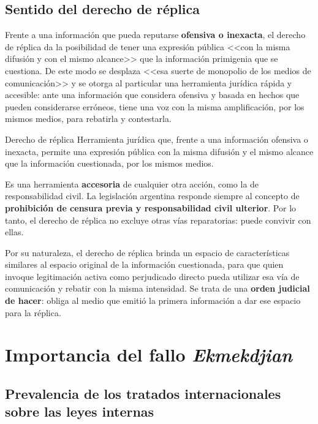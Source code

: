 \documentclass[12pt,oneside]{book}
\begin{document}
\subsection{Sentido del derecho de réplica}

Frente a una información que pueda reputarse \textbf{ofensiva o inexacta}, el derecho de réplica da la posibilidad de tener una expresión pública <<con la misma difusión y con el mismo alcance>> que la información primigenia que se cuestiona. De este modo se desplaza <<esa suerte de monopolio de los medios de comunicación>> y se otorga al particular una herramienta jurídica rápida y accesible: ante una información que considera ofensiva y basada en hechos que pueden considerarse erróneos, tiene una voz con la misma amplificación, por los mismos medios, para rebatirla y contestarla.

\begin{definition}{Derecho de réplica}
Herramienta jurídica que, frente a una información ofensiva o inexacta, permite una expresión pública con la misma difusión y el mismo alcance que la información cuestionada, por los mismos medios.
\end{definition}

Es una herramienta \textbf{accesoria} de cualquier otra acción, como la de responsabilidad civil. La legislación argentina responde siempre al concepto de \textbf{prohibición de censura previa y responsabilidad civil ulterior}. Por lo tanto, el derecho de réplica no excluye otras vías reparatorias: puede convivir con ellas.

\begin{important}
Por su naturaleza, el derecho de réplica brinda un espacio de características similares al espacio original de la información cuestionada, para que quien invoque legitimación activa como perjudicado directo pueda utilizar esa vía de comunicación y rebatir con la misma intensidad. Se trata de una \textbf{orden judicial de hacer}: obliga al medio que emitió la primera información a dar ese espacio para la réplica.
\end{important}

\section{Importancia del fallo \textit{Ekmekdjian}}

\subsection{Prevalencia de los tratados internacionales sobre las leyes internas}
\end{document}
